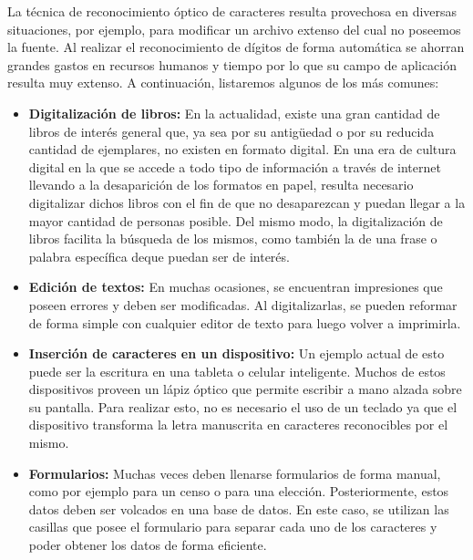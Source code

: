 \documentclass[10pt, a4paper]{article}
\begin{document}
La técnica de reconocimiento óptico de caracteres resulta provechosa en diversas situaciones, por ejemplo, para modificar un archivo extenso del cual no poseemos la fuente. Al realizar el reconocimiento de dígitos de forma automática se ahorran grandes gastos en recursos humanos y tiempo por lo que su campo de aplicación resulta muy extenso. A continuación, listaremos algunos de los más comunes:
\begin{itemize}
 \item \textbf{Digitalización de libros:} En la actualidad, existe una gran cantidad de libros de interés general que, ya sea por su antigüedad o por su reducida cantidad de ejemplares, no existen en formato digital. En una era de cultura digital en la que se accede a todo tipo de información a través de internet llevando a la desaparición de los formatos en papel, resulta necesario digitalizar dichos libros con el fin de que no desaparezcan y puedan llegar a la mayor cantidad de personas posible.\newline
Del mismo modo, la digitalización de libros facilita la búsqueda de los mismos, como también la de una frase o palabra específica deque puedan ser de interés.
 
 \item \textbf{Edición de textos:} En muchas ocasiones, se encuentran impresiones que poseen errores y deben ser modificadas. Al digitalizarlas, se pueden reformar de forma simple con cualquier editor de texto para luego volver a imprimirla.
 
 \item \textbf{Inserción de caracteres en un dispositivo:} Un ejemplo actual de esto puede ser la escritura en una tableta o celular inteligente. Muchos de estos dispositivos proveen un lápiz óptico que permite escribir a mano alzada sobre su pantalla. Para realizar esto, no es necesario el uso de un teclado ya que el dispositivo transforma la letra manuscrita en caracteres reconocibles por el mismo.
 
 \item \textbf{Formularios:} Muchas veces deben llenarse formularios de forma manual, como por ejemplo para un censo o para una elección. Posteriormente, estos datos deben ser volcados en una base de datos. En este caso, se utilizan las casillas que posee el formulario para separar cada uno de los caracteres y poder obtener los datos de forma eficiente.
 

\end{itemize}
\end{document}
